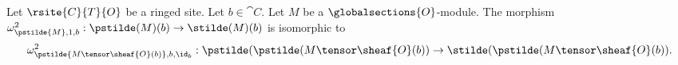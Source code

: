\begin{corollary}
Let $\rsite{C}{T}{O}$ be a ringed site.
Let $b\in \cat{C}$.
Let $M$ be a $\globalsections{O}$-module.
The morphism $\omega^2_{\pstilde{M},1,b}: \pstilde(M)(b) \rightarrow \stilde(M)(b)$
is isomorphic to 
\[\omega^2_{\pstilde{M \tensor \sheaf{O}(b)}, b, \id_b}: 
	\pstilde(\pstilde(M \tensor \sheaf{O}(b)) \rightarrow \stilde(\pstilde(M \tensor \sheaf{O}(b))
.\]
\end{corollary}